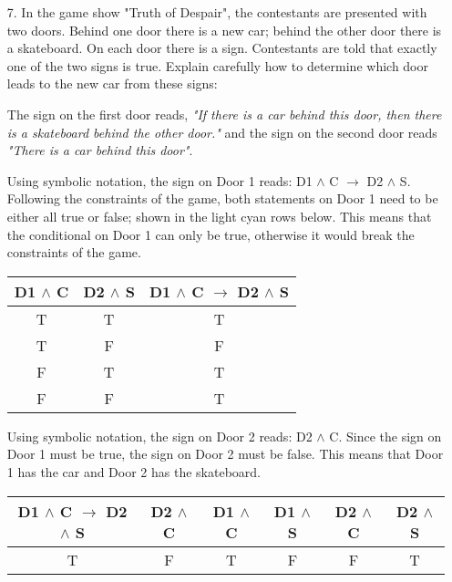 \documentclass{article}
\begin{document}
\begin{itemize}
    \item[7.] In the game show "Truth of Despair", the contestants are presented with two doors.  Behind one door there is a new car; behind the other door there is a skateboard.  On each door there is a sign.  Contestants are told that exactly one of the two signs is true.  Explain carefully how to determine which door leads to the new car from these signs: 
    
    The sign on the first door reads, \emph{"If there is a car behind this door, then there is a skateboard behind the other door."} and the sign on the second door reads \emph{"There is a car behind this door"}.
    
    {\color{blue} Using symbolic notation, the sign on Door 1 reads: D1 $\wedge$ C $\to$ D2 $\wedge$ S. Following the constraints of the game, both statements on Door 1 need to be either all true or false; shown in the light cyan rows below.  This means that the conditional on Door 1 can only be true, otherwise it would break the constraints of the game.}
    \begin{center}
        \begin{tabular}{|c|c|c|}
            \hline
            D1 $\wedge$ C & D2 $\wedge$ S & D1 $\wedge$ C $\to$ D2 $\wedge$ S \\
            \hline
            \rowcolor{LightCyan}
            T & T & T\\
            \hline
            \rowcolor{LightRed}
            T & F & F\\
            \hline
            \rowcolor{LightRed}
            F & T & T\\
            \hline
            \rowcolor{LightCyan}
            F & F & T\\
            \hline
        \end{tabular}
    \end{center}
    
    {\color{blue} Using symbolic notation, the sign on Door 2 reads: D2 $\wedge$ C. Since the sign on Door 1 must be true, the sign on Door 2 must be false.  This means that Door 1 has the car and Door 2 has the skateboard.}
    
    \begin{center}
        \begin{tabular}{|c|c|c|c|c|c|}
            \hline
            D1 $\wedge$ C $\to$ D2 $\wedge$ S & D2 $\wedge$ C & D1 $\wedge$ C & D1 $\wedge$ S & D2 $\wedge$ C & D2 $\wedge$ S\\
            \hline
            T & F & T & F & F & T\\
            \hline
        \end{tabular}
    \end{center}


\end{itemize}
\end{document}
